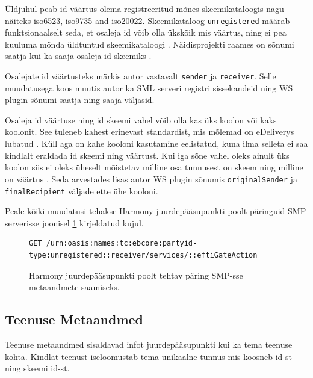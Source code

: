 Üldjuhul peab id väärtus olema registreeritud mõnes skeemikataloogis nagu näiteks iso6523, iso9735 and iso20022.
Skeemikataloog \texttt{unregistered} määrab funktsionaalselt seda, et osaleja id võib olla ükskõik mis väärtus, 
ning ei pea kuuluma mõnda üldtuntud skeemikataloogi \cite[ptk 2.5]{oasis_partyid_v1}. 
Näidisprojekti raames on sõnumi saatja kui ka saaja osaleja id skeemiks
\texttt{}.

Osalejate id väärtusteks märkis autor vastavalt \texttt{sender} ja \texttt{receiver}.
Selle muudatusega koos muutis autor ka SML serveri registri sissekandeid ning WS plugin sõnumi saatja ning saaja väljasid.

Osaleja id väärtuse ning id skeemi vahel võib olla kas üks koolon või kaks koolonit.
See tuleneb kahest erinevast standardist, mis mõlemad on eDeliverys lubatud
\cite[ptk 3.3]{ec_edelivery_smp_21}
\cite[ptk 5.4]{oasis_smp_v2}
\cite[ptk 2.7]{oasis_partyid_v1}.
Küll aga on kahe kooloni kasutamine eelistatud, kuna ilma selleta ei saa kindlalt eraldada id skeemi ning väärtust.
Kui iga sõne vahel oleks ainult üks koolon siis ei oleks üheselt mõistetav milline osa tunnusest on skeem ning milline
on väärtus \cite[Kommentaar 3]{ec_edelivery_smp2_disposition_2024}. Seda arvestades lisas autor WS plugin sõnumis 
\texttt{originalSender} ja \texttt{finalRecipient} väljade ette ühe kooloni. 
 
Peale kõiki muudatusi tehakse Harmony juurdepääsupunkti poolt päringuid SMP serverisse
joonisel \ref{smp-metadata-request-url} kirjeldatud kujul. 

\begin{figure}[H]
  \centering
\begin{lstlisting}[frame=single, basicstyle=\small, breaklines=true]
GET /urn:oasis:names:tc:ebcore:partyid-type:unregistered::receiver/services/::eftiGateAction
\end{lstlisting}
  \caption{Harmony juurdepääsupunkti poolt tehtav päring SMP-sse metaandmete saamiseks.}
  \label{smp-metadata-request-url}
\end{figure}



\subsection{Teenuse Metaandmed}\label{service-metadata-description}
Teenuse metaandmed sisaldavad infot juurdepääsupunkti kui ka tema teenuse kohta. 
Kindlat teenust iseloomustab tema unikaalne tunnus mis koosneb id-st ning skeemi id-st.

